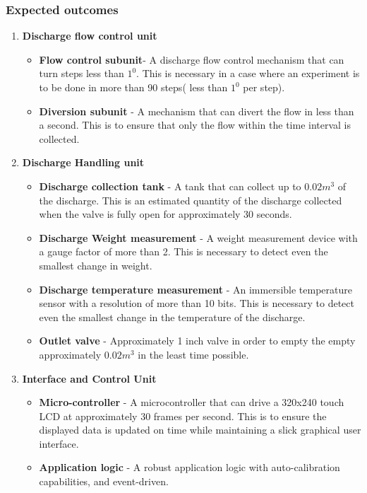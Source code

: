 \subsubsection{Expected outcomes}
\begin{enumerate}
    \item \textbf{Discharge flow control unit}
    \begin{itemize}
        \item \textbf{Flow control subunit}-  A discharge flow control mechanism that can turn steps less than $1^{0}$. This is necessary in a case where an experiment is to be done in more than 90 steps( less than $1^{0}$ per step). 
        \item \textbf{Diversion subunit} - A mechanism that can divert the flow in less than a second. This is to ensure that only the flow within the time interval is collected.
    \end{itemize}
    \item \textbf{Discharge Handling unit}
    \begin{itemize}
        \item \textbf{Discharge collection tank}  - A tank that can collect up to $0.02m^{3}$ of the discharge. This is an estimated quantity of the discharge collected when the valve is fully open for approximately 30 seconds.
        \item \textbf{Discharge Weight measurement} -  A weight measurement device with a gauge factor of more than 2. This is necessary to detect even the smallest change in weight.
        \item \textbf{Discharge temperature measurement} - An immersible temperature sensor with a resolution of more than 10 bits. This is necessary to detect even the smallest change in the temperature of the discharge.
        \item \textbf{Outlet valve} - Approximately 1 inch valve in order to empty the empty approximately $0.02m^{3}$ in the least time possible. 
    \end{itemize}
    \item \textbf{Interface and Control Unit}
    \begin{itemize}
        \item \textbf{Micro-controller} - A microcontroller that can drive a 320x240 touch LCD at approximately 30 frames per second. This is to ensure the displayed data is updated on time while maintaining a slick graphical user interface. 
        \item \textbf{Application logic} - A robust application logic with auto-calibration capabilities, and event-driven. 
    \end{itemize}

\end{enumerate}

